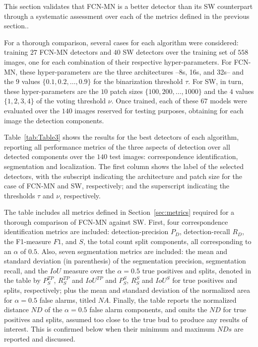 \documentclass[a4paper,authoryear,review]{elsarticle}
\begin{document}
	This section validates that FCN-MN is a better detector than its SW counterpart through a systematic assessment over each of the metrics defined in the previous section.. 
	
	For a thorough comparison, several cases for each algorithm were considered: training $27$ FCN-MN detectors and $40$ SW detectors over the training set of $558$ images, one for each combination of their respective hyper-parameters. For FCN-MN, these hyper-parameters are the three architectures --8s, 16s, and 32s-- and the $9$ values $\{0.1, 0.2, \ldots, 0.9\}$ for the binarization threshold $\tau$. For SW, in turn, these hyper-parameters are the $10$ patch sizes $\{100, 200, \ldots, 1000\}$ and the $4$ values $\{1, 2, 3, 4\}$ of the voting threshold $\nu$. Once trained, each of these $67$ models were evaluated over the $140$ images reserved for testing purposes, obtaining for each image the detection components.
	
	Table~\ref{tab:Table3} shows the results for the best detectors of each algorithm, reporting all performance metrics of the three aspects of detection over all detected components over the $140$ test images: correspondence identification, segmentation and localization. The first column shows the label of the selected detectors, with the subscript indicating the architecture and patch size for the case of FCN-MN and SW, respectively; and the superscript indicating the thresholds $\tau$ and $\nu$, respectively.
	
	The table includes all metrics defined in Section~\ref{sec:metrics} required for a thorough comparison of FCN-MN against SW. First, four correspondence identification metrics are included: detection-precision $P_D$, detection-recall $R_D$, the F1-measure $F1$, and $S$, the total count split components, all corresponding to an $\alpha$ of $0.5$. Also, seven segmentation metrics are included: the mean and standard deviation (in parenthesis) of the segmentation precision, segmentation recall, and the $IoU$ measure over the $\alpha=0.5$ true positives and splits, denoted in the table by $P_S^{TP}$, $R_S^{TP}$ and $IoU^{TP}$ and $P_S^S$, $R_S^S$ and $IoU^S$ for true positives and splits, respectively; plus the mean and standard deviation of the normalized area for $\alpha=0.5$ false alarms, titled $NA$. 
	Finally, the table reports the normalized distance $ND$ of the $\alpha=0.5$ false alarm components, and omits the $ND$ for true positives and splits, assumed too close to the true bud to produce any results of interest. This is confirmed below when their minimum and maximum $NDs$ are reported and discussed. 
	
\end{document}
